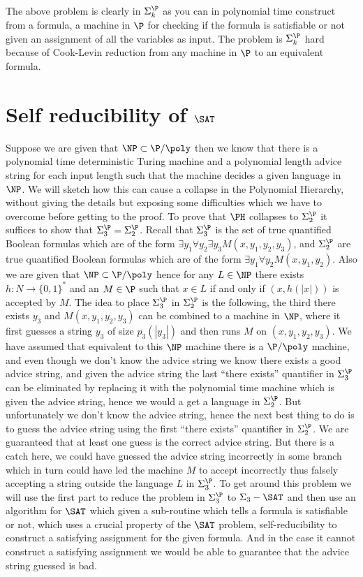 The above problem is clearly in $\Sigma_k^\P$ as you can in polynomial
time construct from a formula, a machine in $\P$ for checking if the
formula is satisfiable or not given an assignment of all the variables
as input. The problem is $\Sigma_k^\P$ hard because
of Cook-Levin reduction from any machine in $\P$ to an equivalent formula.
 
\section{Self reducibility of $\SAT$}

Suppose we are given that $\NP \subset \P/\poly$ then we know that
there is a polynomial time deterministic Turing machine and a
polynomial length advice string for each input length such that the
machine decides a given language in $\NP$. We will sketch how this can
cause a collapse in the Polynomial Hierarchy, without giving the
details but exposing some difficulties which we have to overcome
before getting to the proof. To prove that $\PH$ collapses to
$\Sigma_2^\P$ it suffices to show that $\Sigma_3^\P=\Sigma_2^\P$. Recall
that $\Sigma_3^\P$ is the set of true quantified Boolean formulas which
are of the form $\exists y_1 \forall y_2 \exists y_3
M(x,y_1,y_2,y_3)$, and $\Sigma_2^\P$ are true quantified Boolean
formulas which are of the form $\exists y_1 \forall y_2
M(x,y_1,y_2)$. Also we are given that $\NP \subset \P/\poly$ hence for
any $L\in \NP$ there exists $h:N \to \{0,1\}^*$ and an $M\in \P$ such
that $x \in L$ if and only if $(x,h(|x|))$ is accepted by $M$. The
idea to place $\Sigma_3^\P$ in $\Sigma_2^\P$ is the following, the third
there exists $y_3$ and $M(x,y_1,y_2,y_3)$ can be combined to a machine
in $\NP$, where it first guesses a string $y_3$ of size $p_3(|y_3|)$
and then runs $M$ on $(x,y_1,y_2,y_3)$. We have assumed that
equivalent to this $\NP$ machine there is a $\P/\poly$ machine, and
even though we don't know the advice string we know there exists a
good advice string, and given the advice string the last ``there
exists'' quantifier in $\Sigma_3^\P$ can be eliminated by replacing it
with the polynomial time machine which is given the advice string,
hence we would a get a language in $\Sigma_2^\P$. But unfortunately we
don't know the advice string, hence the next best thing to do is to
guess the advice string using the first ``there exists'' quantifier in
$\Sigma_2^\P$. We are guaranteed that at least one guess is the
correct advice string. But there is a catch here, we could have
guessed the advice string incorrectly in some branch which in turn
could have led the machine $M$ to accept incorrectly thus falsely
accepting a string outside the language $L$ in $\Sigma_3^\P$. To get
around this problem we will use the first part to reduce the problem
in $\Sigma_3^\P$ to $\Sigma_3-\SAT$ and then use an algorithm for
$\SAT$ which given a sub-routine which tells a formula is satisfiable
or not, which uses a crucial property of the $\SAT$ problem,
self-reducibility to construct a satisfying assignment for the given
formula. And in the case it cannot construct a satisfying assignment
we would be able to guarantee that the advice string guessed is bad.

